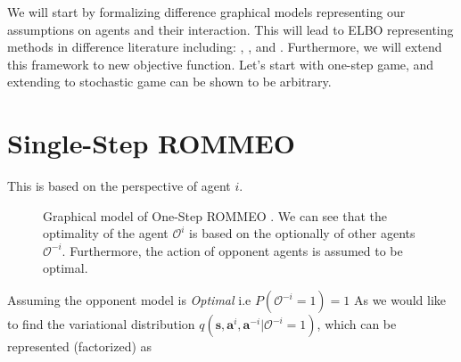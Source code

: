 We will start by formalizing difference graphical models representing our assumptions on agents and their interaction. This will lead to ELBO representing methods in difference literature including:  \cite{tian2019regularized}, \cite{grau2018balancing}, and \cite{wen2019probabilistic}. Furthermore, we will extend this framework to new objective function. Let's start with one-step game, and extending to stochastic game can be shown to be arbitrary.

\section{Single-Step ROMMEO \cite{tian2019regularized}}

This is based on the perspective of agent $i$.

\begin{figure}[ht]
    \begin{minipage}[t]{0.5\linewidth}
    \centering
    \label{ROMMEO-Graphical}
    \end{minipage}%
    \begin{minipage}[t]{0.5\linewidth}
    Graphical model of One-Step ROMMEO \cite{tian2019regularized}. We can see that the optimality of the agent $\mathcal{O}^{i}$ is based on the optionally of other agents $\mathcal{O}^{-i}$. Furthermore, the action of opponent agents is assumed to be optimal.
    \end{minipage}
\end{figure}

 
Assuming the opponent model is \emph{Optimal} i.e $P(\mathcal{O}^{-i} = 1) = 1$ As we would like to find the variational distribution $q(\boldsymbol{s}, \boldsymbol{a}^i, \boldsymbol{a}^{-i} | \mathcal{O}^{-i} = 1)$, which can be represented (factorized) as 

